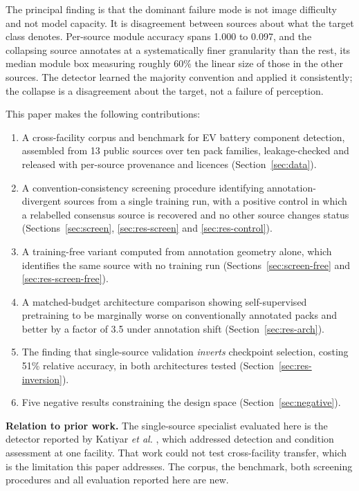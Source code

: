 \documentclass[conference]{IEEEtran}
\begin{document}
The principal finding is that the dominant failure mode is not image difficulty
and not model capacity. It is disagreement between sources about what the target
class denotes. Per-source module accuracy spans 1.000 to 0.097, and the collapsing
source annotates at a systematically finer granularity than the rest, its median
module box measuring roughly 60\% the linear size of those in the other sources. The detector
learned the majority convention and applied it consistently; the collapse is a
disagreement about the target, not a failure of perception.

This paper makes the following contributions:

\begin{enumerate}
\item A cross-facility corpus and benchmark for EV battery component detection,
assembled from 13 public sources over ten pack families, leakage-checked and released
with per-source provenance and licences (Section~\ref{sec:data}).
\item A convention-consistency screening procedure identifying annotation-divergent
sources from a single training run, with a positive control in which a relabelled
consensus source is recovered and no other source changes status
(Sections~\ref{sec:screen}, \ref{sec:res-screen} and \ref{sec:res-control}).
\item A training-free variant computed from annotation geometry alone, which
identifies the same source with no training run (Sections~\ref{sec:screen-free} and
\ref{sec:res-screen-free}).
\item A matched-budget architecture comparison showing self-supervised pretraining to
be marginally worse on conventionally annotated packs and better by a factor of 3.5
under annotation shift (Section~\ref{sec:res-arch}).
\item The finding that single-source validation \emph{inverts} checkpoint selection,
costing 51\% relative accuracy, in both architectures tested
(Section~\ref{sec:res-inversion}).
\item Five negative results constraining the design space
(Section~\ref{sec:negative}).
\end{enumerate}

\textbf{Relation to prior work.} The single-source specialist evaluated here is the
detector reported by Katiyar \emph{et al.} \cite{katiyar2026mvml}, which addressed detection
and condition assessment at one facility. That work could not test cross-facility
transfer, which is the limitation this paper addresses. The corpus, the benchmark,
both screening procedures and all evaluation reported here are new.
\end{document}
